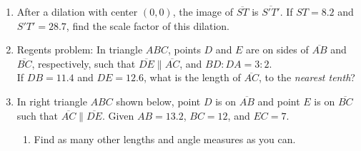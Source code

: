 \begin{enumerate}
\newpage
\item After a dilation with center $(0,0)$, the image of $\overline{ST}$ is $\overline{S'T'}$. If $ST=8.2$ and $S'T'=28.7$, find the scale factor of this dilation. \vspace{2cm}

\item Regents problem: In triangle $ABC$, points $D$ and $E$ are on sides of $\overline{AB}$ and $\overline{BC}$, respectively, such that $\overline{DE} \parallel \overline{AC}$, and $BD:DA = 3:2$.\\[0.5cm]
If $DB=11.4$ and $DE=12.6$, what is the length of $\overline{AC}$, to the \emph{nearest tenth}?
\begin{flushright}
\end{flushright}


\item In right triangle $ABC$ shown below, point $D$ is on $\overline{AB}$ and point $E$ is on $\overline{BC}$ such that $\overline{AC} \parallel \overline{DE}$. Given $AB=13.2$, $BC=12$, and $EC=7$.
    \begin{enumerate}
       \vspace{1.5cm}
  \item Find as many other lengths and angle measures as you can.
\end{enumerate}

\end{enumerate}

